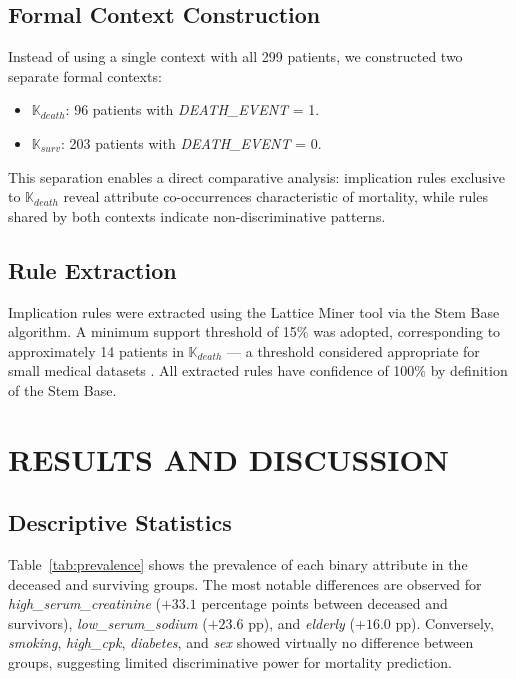 \documentclass[a4paper,twoside]{article}
\begin{document}
\subsection{Formal Context Construction}

Instead of using a single context with all 299 patients, we constructed two separate formal contexts:

\begin{itemize}
    \item $\mathbb{K}_{death}$: 96 patients with \textit{DEATH\_EVENT} = 1.
    \item $\mathbb{K}_{surv}$: 203 patients with \textit{DEATH\_EVENT} = 0.
\end{itemize}

This separation enables a direct comparative analysis: implication rules exclusive to $\mathbb{K}_{death}$ reveal attribute co-occurrences characteristic of mortality, while rules shared by both contexts indicate non-discriminative patterns.

\subsection{Rule Extraction}

Implication rules were extracted using the Lattice Miner tool \cite{Missaoui2017} via the Stem Base algorithm. A minimum support threshold of 15\% was adopted, corresponding to approximately 14 patients in $\mathbb{K}_{death}$ — a threshold considered appropriate for small medical datasets \cite{Agrawal1994}. All extracted rules have confidence of 100\% by definition of the Stem Base.

\section{\uppercase{Results and Discussion}}
\label{sec:results}

\subsection{Descriptive Statistics}

Table~\ref{tab:prevalence} shows the prevalence of each binary attribute in the deceased and surviving groups. The most notable differences are observed for \textit{high\_serum\_creatinine} ($+33.1$ percentage points between deceased and survivors), \textit{low\_serum\_sodium} ($+23.6$ pp), and \textit{elderly} ($+16.0$ pp). Conversely, \textit{smoking}, \textit{high\_cpk}, \textit{diabetes}, and \textit{sex} showed virtually no difference between groups, suggesting limited discriminative power for mortality prediction.
\end{document}
